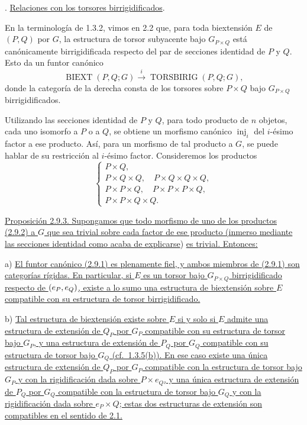 \par\medskip{}. \underline{Relaciones con los torsores birrigidificados}.

En la terminología de 1.3.2, vimos en 2.2 que, para toda biextensión
$E$ de $(P,Q)$ por $G$, la estructura de torsor subyacente bajo
$G_{P\times Q}$ está canónicamente birrigidificada respecto del par de
secciones identidad de $P$ y $Q$. Esto da un funtor canónico
\begin{equation}\tag{2.9.1}
 \operatorname{BIEXT}(P,Q;G)
 \xrightarrow{\ i\ }
 \operatorname{TORSBIRIG}(P,Q;G),
\end{equation}
donde la categoría de la derecha consta de los torsores sobre
$P\times Q$ bajo $G_{P\times Q}$ birrigidificados.

Utilizando las secciones identidad de $P$ y $Q$, para todo producto de
$n$ objetos, cada uno isomorfo a $P$ o a $Q$, se obtiene un morfismo
canónico $\operatorname{inj}_i$ del $i$-ésimo factor a ese producto.
Así, para un morfismo de tal producto a $G$, se puede hablar de su
restricción al $i$-ésimo factor. Consideremos los productos
\begin{equation}\tag{2.9.2}
 \left\{
 \begin{array}{l}
 P\times Q,\\[1mm]
 P\times Q\times Q,\quad P\times Q\times Q\times Q,\\[1mm]
 P\times P\times Q,\quad P\times P\times P\times Q,\\[1mm]
 P\times P\times Q\times Q.
 \end{array}
 \right.
\end{equation}

\underline{Proposición 2.9.3. Supongamos que todo morfismo de uno de
los productos (2.9.2) a $G$ que sea trivial sobre cada factor de ese
producto (inmerso mediante las secciones identidad como acaba de
explicarse}) \underline{es trivial. Entonces:}

\medskip
\noindent
a) \underline{El funtor canónico (2.9.1) es plenamente fiel, y ambos
miembros de (2.9.1) son categorías rígidas. En particular, si $E$ es
un torsor bajo $G_{P\times Q}$ birrigidificado respecto de
$(\sisi{e_P}{e_P},e_Q)$, existe a lo sumo una estructura de
biextensión sobre $E$ compatible con su estructura de torsor
birrigidificado.}

\medskip
\noindent
b) \underline{Tal estructura de biextensión existe sobre $E$ si y
solo si $E$ admite una estructura de extensión de $Q_P$ por $G_P$
compatible con su estructura de torsor bajo $G_P$, y una estructura
de extensión de $P_Q$ por $G_Q$ compatible con su estructura de torsor
bajo $G_Q$ (cf.\ 1.3.5(b)). En ese caso existe una única estructura de
extensión de $Q_P$ por $G_P$ compatible con la estructura de torsor
bajo $G_P$ y con la rigidificación dada sobre $P\times e_Q$, y una
única estructura de extensión de $P_Q$ por $G_Q$ compatible con la
estructura de torsor bajo $G_Q$ y con la rigidificación dada sobre
$e_P\times Q$; estas dos estructuras de extensión son compatibles en
el sentido de 2.1.}

